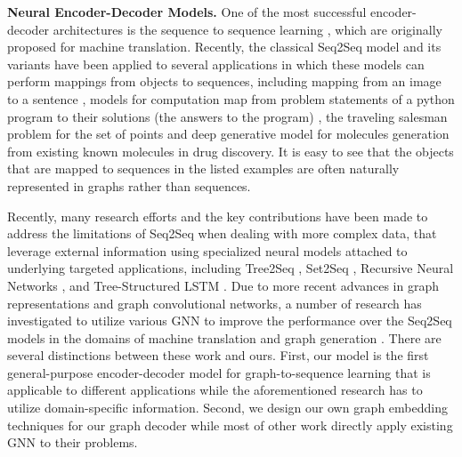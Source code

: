 \documentclass{article} \usepackage{iclr2019_conference,times}
\begin{document}
\textbf{Neural Encoder-Decoder Models.} One of the most successful encoder-decoder architectures is the sequence to sequence learning \citep{DBLP:conf/nips/SutskeverVL14,cho2014learning,bahdanau2014neural,luong2015effective,gehring2017convolutional}, which are originally proposed for machine translation. Recently, the classical Seq2Seq model and its variants have been applied to several
applications in which these models can perform mappings from objects to sequences, including mapping from an image to a sentence \citep{vinyals2015show}, models for computation map from problem statements of a python program to their solutions (the answers to the program) \citep{zaremba2014learning}, the traveling salesman problem for the set of points \citep{vinyals2015pointer} and deep generative model for molecules generation from existing known molecules in drug discovery. It is easy to see that the objects that are mapped to sequences in the listed examples are often naturally represented in graphs rather than sequences. 

Recently, many research efforts and the key contributions have been made to address the limitations of Seq2Seq when dealing with more complex data, that leverage external information using specialized neural models attached to underlying targeted applications, including Tree2Seq \citep{eriguchi2016tree}, Set2Seq \citep{vinyals2015order}, Recursive Neural Networks \citep{socher2010learning}, and Tree-Structured LSTM \citep{tai2015improved}. Due to more recent advances in graph representations and graph convolutional networks, a number of research has investigated to utilize various GNN to improve the performance over the Seq2Seq models in the domains of machine translation and graph generation \citep{bastings2017graph,beck2018graph,simonovsky2018graphvae,li2018learning}.
There are several distinctions between these work and ours. First, our model is the first general-purpose encoder-decoder model for graph-to-sequence learning that is applicable to different applications while the aforementioned research has to utilize domain-specific information. Second, we design our own graph embedding techniques for our graph decoder while most of other work directly apply existing GNN to their problems. 
\end{document}
